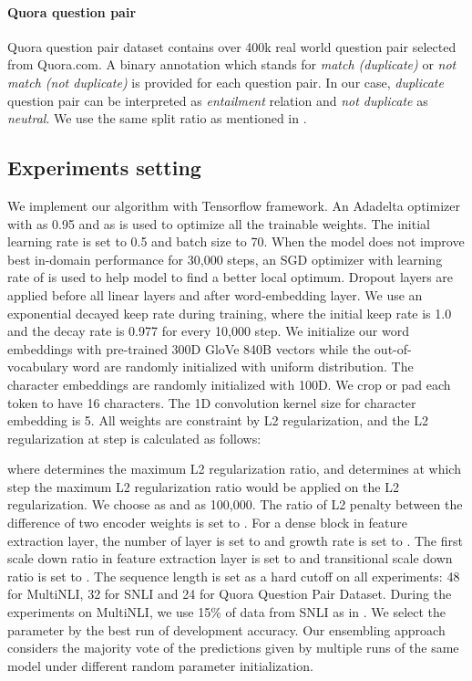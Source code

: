 \documentclass{article} \usepackage{iclr2018_conference,times}
\begin{document}
\paragraph{Quora question pair} Quora question pair dataset contains over 400k real world question pair selected from Quora.com. A binary annotation which stands for \textit{match (duplicate)} or \textit{not match (not duplicate)} is provided for each question pair. In our case, \textit{duplicate} question pair can be interpreted as \textit{entailment} relation and \textit{not duplicate} as \textit{neutral}. We use the same split ratio as mentioned in \citep{BIMPM_Wang:2017td}.




\subsection{Experiments setting}
We implement our algorithm with Tensorflow\citep{tensorflowAbadi:2016wn} framework. An Adadelta optimizer\citep{adadelta_2012arXiv1212.5701Z} with  as 0.95 and  as  is used to optimize all the trainable weights. The initial learning rate is set to 0.5 and batch size to 70. When the model does not improve best in-domain performance for 30,000 steps, an SGD optimizer with learning rate of  is used to help model to find a better local optimum. Dropout layers are applied before all linear layers and after word-embedding layer. We use an exponential decayed keep rate during training, where the initial keep rate is 1.0 and the decay rate is 0.977 for every 10,000 step. We initialize our word embeddings with pre-trained 300D GloVe 840B vectors \cite{GloVe_Pennington:2014jd} while the out-of-vocabulary word are randomly initialized with uniform distribution. The character embeddings are randomly initialized with 100D. We crop or pad each token to have 16 characters. The 1D convolution kernel size for character embedding is 5. All weights are constraint by L2 regularization, and the L2 regularization at step  is calculated as follows:

where  determines the maximum L2 regularization ratio, and  determines at which step the maximum L2 regularization ratio would be applied on the L2 regularization. We choose  as  and  as 100,000.
The ratio of L2 penalty between the difference of two encoder weights is set to . For a dense block in feature extraction layer, the number of layer  is set to  and growth rate  is set to . The first scale down ratio  in feature extraction layer is set to  and transitional scale down ratio  is set to . The sequence length is set as a hard cutoff on all experiments: 48 for MultiNLI, 32 for SNLI and 24 for Quora Question Pair Dataset. During the experiments on MultiNLI, we use 15\% of data from SNLI as in \citet{MultiNLI_Williams:2017tk}. We select the parameter by the best run of development accuracy. Our ensembling approach considers the majority vote of the predictions given by multiple runs of the same model under different random parameter initialization.
\end{document}
